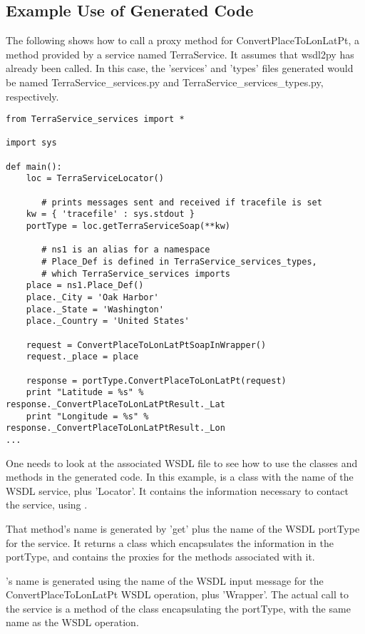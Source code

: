 \subsection{Example Use of Generated Code}

The following shows how to call a proxy method for
ConvertPlaceToLonLatPt, a method provided by a service
named TerraService. It assumes that wsdl2py has already been called.
In this case, the 'services' and 'types' files generated would
be named TerraService_services.py and TerraService_services_types.py,
respectively.

\begin{verbatim}
from TerraService_services import *

import sys

def main():
    loc = TerraServiceLocator()

       # prints messages sent and received if tracefile is set
    kw = { 'tracefile' : sys.stdout }
    portType = loc.getTerraServiceSoap(**kw)

       # ns1 is an alias for a namespace
       # Place_Def is defined in TerraService_services_types,
       # which TerraService_services imports
    place = ns1.Place_Def()
    place._City = 'Oak Harbor'
    place._State = 'Washington'
    place._Country = 'United States'

    request = ConvertPlaceToLonLatPtSoapInWrapper()
    request._place = place

    response = portType.ConvertPlaceToLonLatPt(request)
    print "Latitude = %s" % response._ConvertPlaceToLonLatPtResult._Lat
    print "Longitude = %s" % response._ConvertPlaceToLonLatPtResult._Lon
...

\end{verbatim}

One needs to look at the associated WSDL file to see how
to use the classes and methods in the generated code.
In this example, 
is a class with the name of the WSDL service, plus 'Locator'.  It contains the
information necessary to contact the service, using
.

That method's name is generated by 'get' plus the name of the WSDL portType
for the service.  It returns a class which
encapsulates the information in the portType, and contains the proxies
for the methods associated with it.

's
name is generated using
the name of the WSDL input message for the ConvertPlaceToLonLatPt
WSDL operation, plus 'Wrapper'.  The actual call to the service is a method of
the class encapsulating the portType, with the same name as the WSDL operation.

